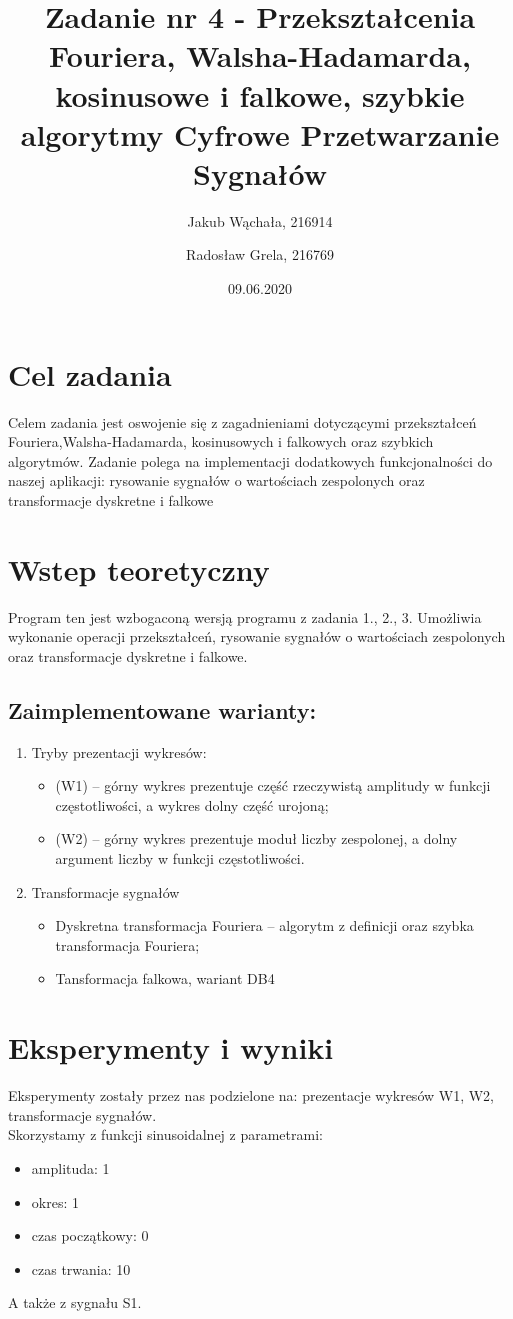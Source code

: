 \documentclass[12pt]{article}
\title{{\bf Zadanie nr 4 - Przekształcenia Fouriera, Walsha-Hadamarda, kosinusowe i falkowe, szybkie algorytmy}\linebreak
Cyfrowe Przetwarzanie Sygnałów}
\author{Jakub Wąchała, 216914 \and Radosław Grela, 216769}
\date{09.06.2020}
\begin{document}
\clearpage\maketitle
\thispagestyle{empty}
\newpage
\setcounter{page}{1}
\section{Cel zadania}
\label{cel}
Celem zadania jest oswojenie się z zagadnieniami dotyczącymi przekształceń Fouriera,Walsha-Hadamarda, kosinusowych i falkowych oraz szybkich algorytmów. Zadanie polega na implementacji dodatkowych funkcjonalności do naszej aplikacji: rysowanie sygnałów o wartościach zespolonych oraz transformacje dyskretne i falkowe \cite{bib1}

\section{Wstep teoretyczny}
Program ten jest wzbogaconą wersją programu z zadania 1., 2., 3. Umożliwia wykonanie operacji przekształceń,  rysowanie sygnałów o wartościach zespolonych oraz transformacje dyskretne i falkowe.

\subsection {Zaimplementowane warianty:}
\begin {enumerate}
\item Tryby prezentacji wykresów:
\begin {itemize}
\item (W1) – górny wykres prezentuje część rzeczywistą amplitudy w funkcji częstotliwości, a wykres dolny część urojoną;
\item (W2) – górny wykres prezentuje moduł liczby zespolonej, a dolny argument liczby w funkcji częstotliwości.
\end {itemize}
\item Transformacje sygnałów
\begin {itemize}
\item Dyskretna transformacja Fouriera – algorytm z definicji oraz szybka transformacja Fouriera;
\item Tansformacja falkowa, wariant DB4
\end {itemize}
\end{enumerate}

\section{Eksperymenty i wyniki}
Eksperymenty zostały przez nas podzielone na: prezentacje wykresów W1, W2, transformacje sygnałów.  
\\
Skorzystamy z funkcji sinusoidalnej z parametrami:
\begin{itemize}
\item amplituda: 1
\item okres: 1
\item czas początkowy: 0
\item czas trwania: 10
\end{itemize}
A także z sygnału S1.
\end{document}

